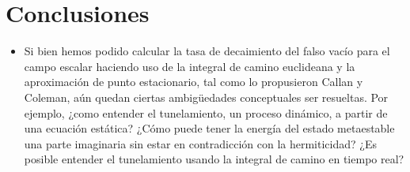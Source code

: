 \documentclass[11pt, a4paper]{article}
\numberwithin{equation}{section}
\theoremstyle{definition}
\begin{document}
\section{Conclusiones}

\begin{itemize}

\item  Si bien hemos podido calcular la tasa de decaimiento del falso vacío para el campo escalar haciendo uso de la integral de camino euclideana y la aproximación de punto estacionario, tal como lo propusieron Callan y Coleman, aún quedan ciertas ambigüedades conceptuales  ser resueltas. Por ejemplo, ¿como entender el tunelamiento, un proceso dinámico, a partir de una ecuación estática? ¿Cómo puede tener la energía del estado metaestable una parte imaginaria sin estar en contradicción con la hermiticidad? ¿Es posible entender el tunelamiento usando la integral de camino en tiempo real? \cite{Ai:2019dqr}

\printbibliography
{}

\end{itemize}
\end{document}
